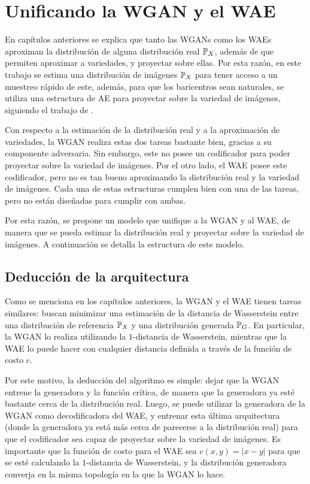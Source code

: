 \chapter{Unificando la WGAN y el WAE}\label{chap:WAE-WGAN}  %

En capítulos anteriores se explica que tanto las WGANs como los WAEs aproximan la distribución de alguna distribución real $\Prob_X$, además de que permiten aproximar a variedades, y proyectar sobre ellas.
Por esta razón, en este trabajo se estima una distribución de imágenes $\Prob_X$ para tener acceso a un muestreo rápido de este, además, para que los baricentros sean naturales, se utiliza una estructura de AE para proyectar sobre la variedad de imágenes, siguiendo el trabajo de \cite{simon2020barycenters}.

Con respecto a la estimación de la distribución real y a la aproximación de variedades, la WGAN realiza estas dos tareas bastante bien, gracias a su componente adversaria. Sin embargo, este no posee un codificador para poder proyectar sobre la variedad de imágenes. Por el otro lado, el WAE posee este codificador, pero no es tan bueno aproximando la distribución real y la variedad de imágenes. Cada una de estas estructuras cumplen bien con una de las tareas, pero no están diseñadas para cumplir con ambas.

Por esta razón, se propone un modelo que unifique a la WGAN y al WAE, de manera que se pueda estimar la distribución real y proyectar sobre la variedad de imágenes. A continuación se detalla la estructura de este modelo.

\section{Deducción de la arquitectura}\label{sec:deduccion-arquitectura-wae-wgan}  %

Como se menciona en los capítulos anteriores, la WGAN y el WAE tienen tareas similares: buscan minimizar una estimación de la distancia de Wasserstein entre una distribución de referencia $\Prob_X$ y una distribución generada $\Prob_G$. En particular, la WGAN lo realiza utilizando la $1$-distancia de Wasserstein, mientras que la WAE lo puede hacer con cualquier distancia definida a través de la función de costo $c$.

Por este motivo, la deducción del algoritmo es simple: dejar que la WGAN entrene la generadora y la función crítica, de manera que la generadora ya esté bastante cerca de la distribución real. Luego, se puede utilizar la generadora de la WGAN como decodificadora del WAE, y entrenar esta última arquitectura (donde la generadora ya está más cerca de parecerse a la distribución real) para que el codificador sea capaz de proyectar sobre la variedad de imágenes. Es importante que la función de costo para el WAE sea $c(x, y) = |x - y|$ para que se esté calculando la $1$-distancia de Wasserstein, y la distribución generadora converja en la misma topología en la que la WGAN lo hace.

